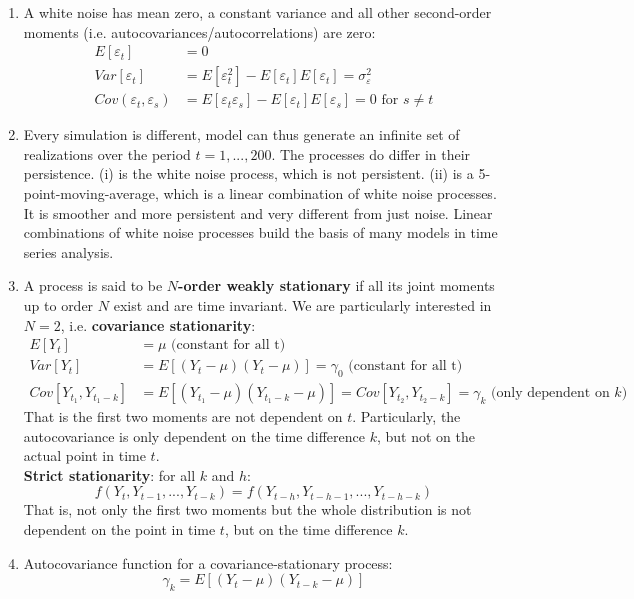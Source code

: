 \begin{enumerate}
\item A white noise has mean zero, a constant variance and all other second-order moments (i.e. autocovariances/autocorrelations) are zero:
\begin{align*}
    E[\varepsilon_t]&=0\\
    Var[\varepsilon_t]&=E[\varepsilon_t^2] - E[\varepsilon_t]E[\varepsilon_t] = \sigma_\varepsilon^2\\
    Cov(\varepsilon_{t},\varepsilon_s) &= E[\varepsilon_t \varepsilon_s] - E[\varepsilon_t]E[\varepsilon_s] = 0 \text{ for $s \neq t$}
\end{align*}	
\item 
Every simulation is different, model can thus generate an infinite set of realizations over the period $t=1,...,200$.
The processes do differ in their persistence.
(i) is the white noise process, which is not persistent.
(ii) is a 5-point-moving-average, which is a linear combination of white noise processes.
It is smoother and more persistent and very different from just noise.
Linear combinations of white noise processes build the basis of many models in time series analysis.
\item A process is said to be \textbf{$N$-order weakly stationary} if all its joint moments up to order $N$ exist and are time invariant.
We are particularly interested in $N=2$, i.e. \textbf{covariance stationarity}:
\begin{align*}
E[Y_t]&=\mu \text{ (constant for all t)}
\\
Var[Y_t]&=E[(Y_t - \mu)(Y_t-\mu)]=\gamma_0 \text{ (constant for all t)}
\\
Cov[Y_{t_1},Y_{t_1-k}] &= E[(Y_{t_1}-\mu)(Y_{t_1-k}-\mu)] = Cov[Y_{t_2},Y_{t_2-k}] = \gamma_k  \text{ (only dependent on $k$)}
\end{align*}
That is the first two moments are not dependent on $t$.
Particularly, the autocovariance is only dependent on the time difference $k$, but not on the actual point in time $t$.
\\
\textbf{Strict stationarity}: for all $k$ and $h$: $$f(Y_t,Y_{t-1},...,Y_{t-k})=f(Y_{t-h},Y_{t-h-1},...,Y_{t-h-k})$$
That is, not only the first two moments but the whole distribution is not dependent on the point in time $t$,
  but on the time difference $k$.
\item Autocovariance function for a covariance-stationary process:
$$\gamma_k = E[(Y_t - \mu)(Y_{t-k}-\mu)]$$

\end{enumerate}
